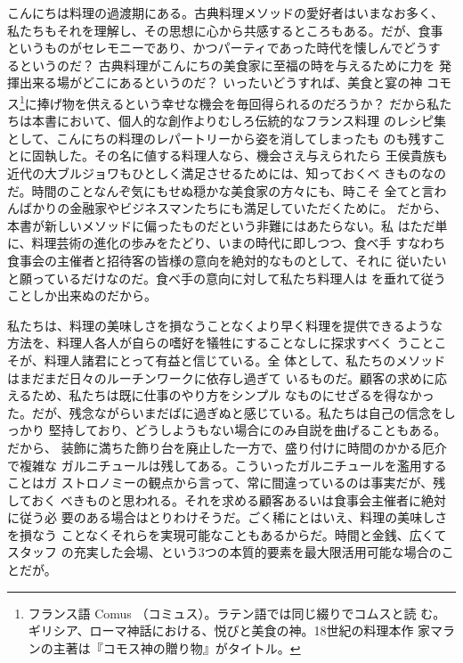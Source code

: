 こんにちは料理の過渡期にある。古典料理メソッドの愛好者はいまなお多く、
私たちもそれを理解し、その思想に心から共感するところもある。だが、食事
というものがセレモニーであり、かつパーティであった時代を懐しんでどうす
るというのだ？ 古典料理がこんにちの美食家に至福の時を与えるために力を
発揮出来る場がどこにあるというのだ？ いったいどうすれば、美食と宴の神
コモス\footnote{フランス語 Comus
  （コミュス）。ラテン語では同じ綴りでコムスと読
  む。ギリシア、ローマ神話における、悦びと美食の神。18世紀の料理本作
  家マランの主著は『コモス神の贈り物』がタイトル。}に捧げ物を供えるという幸せな機会を毎回得られるのだろうか？
だから私たちは本書において、個人的な創作よりむしろ伝統的なフランス料理
のレシピ集として、こんにちの料理のレパートリーから姿を消してしまったも
のも残すことに固執した。その名に値する料理人なら、機会さえ与えられたら
王侯貴族も近代の大ブルジョワもひとしく満足させるためには、知っておくべ
きものなのだ。時間のことなんぞ気にもせぬ穏かな美食家の方々にも、時こそ
全てと言わんばかりの金融家やビジネスマンたちにも満足していただくために。
だから、本書が新しいメソッドに偏ったものだという非難にはあたらない。私
はただ単に、料理芸術の進化の歩みをたどり、いまの時代に即しつつ、食べ手
すなわち食事会の主催者と招待客の皆様の意向を絶対的なものとして、それに
従いたいと願っているだけなのだ。食べ手の意向に対して私たち料理人は
を垂れて従うことしか出来ぬのだから。

私たちは、料理の美味しさを損なうことなくより早く料理を提供できるような
方法を、料理人各人が自らの嗜好を犠牲にすることなしに探求すべく
うことこそが、料理人諸君にとって有益と信じている。全
体として、私たちのメソッドはまだまだ日々のルーチンワークに依存し過ぎて
いるものだ。顧客の求めに応えるため、私たちは既に仕事のやり方をシンプル
なものにせざるを得なかった。だが、残念ながらいまだばに過ぎぬと感じている。私たちは自己の信念をしっかり
堅持しており、どうしようもない場合にのみ自説を曲げることもある。だから、
装飾に満ちた飾り台を廃止した一方で、盛り付けに時間のかかる厄介で複雑な
ガルニチュールは残してある。こういったガルニチュールを濫用することはガ
ストロノミーの観点から言って、常に間違っているのは事実だが、残しておく
べきものと思われる。それを求める顧客あるいは食事会主催者に絶対に従う必
要のある場合はとりわけそうだ。ごく稀にとはいえ、料理の美味しさを損なう
ことなくそれらを実現可能なこともあるからだ。時間と金銭、広くてスタッフ
の充実した会場、という3つの本質的要素を最大限活用可能な場合のことだが。

